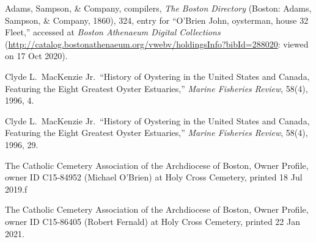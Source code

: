 \begin{thebibliography}{999}
Adams, Sampson, \& Company, compilers, \textit{The Boston Directory} (Boston: Adams, Sampson, \& Company, 1860), 324, entry for ``O'Brien John, oysterman, house 32 Fleet,'' accessed at \textit{Boston Athenaeum Digital Collections} (\url{http://catalog.bostonathenaeum.org/vwebv/holdingsInfo?bibId=288020}: viewed on 17 Oct 2020).

Clyde L.\ MacKenzie Jr.\, ``History of Oystering in the United States and Canada, Featuring the Eight Greatest Oyster Estuaries,'' \textit{Marine Fisheries Review}, 58(4), 1996, 4. 

Clyde L.\ MacKenzie Jr.\, ``History of Oystering in the United States and Canada, Featuring the Eight Greatest Oyster Estuaries,'' \textit{Marine Fisheries Review}, 58(4), 1996, 29.

The Catholic Cemetery Association of the Archdiocese of Boston, Owner Profile, owner ID C15-84952 (Michael O'Brien) at Holy Cross Cemetery, printed 18 Jul 2019.ƒ

The Catholic Cemetery Association of the Archdiocese of Boston, Owner Profile, owner ID C15-86405 (Robert Fernald) at Holy Cross Cemetery, printed 22 Jan 2021.


\end{thebibliography}
